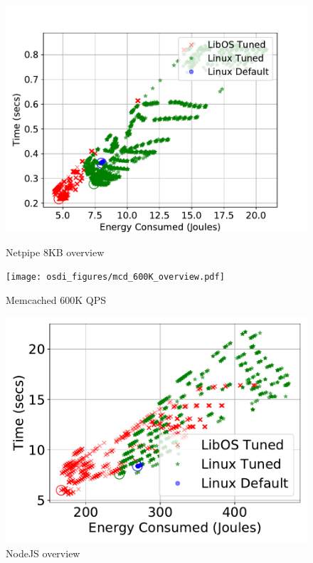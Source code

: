 \begin{figure}[t!]
\centering	
\begin{minipage}[t]{0.45\textwidth}
\includegraphics[width=\textwidth]{osdi_figures/netpipe_8192_overview.pdf}
	\caption{Netpipe 8KB overview}
	\label{fig:netpipe8Kov}
\end{minipage}
\begin{minipage}[t]{0.45\textwidth}
	\texttt{[image: osdi\_figures/mcd\_600K\_overview.pdf]}
	\caption{Memcached 600K QPS}
	\label{fig:mcdov}
\end{minipage}
\begin{minipage}[t]{0.45\textwidth}
	\includegraphics[width=\textwidth]{osdi_figures/nodejs_overview.pdf}
	\caption{NodeJS overview}

\end{minipage}
\end{figure}
